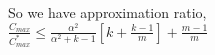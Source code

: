 \documentclass[10pt, conference, compsocconf]{IEEEtran}
\begin{document}
 
 So we have approximation ratio,\\
\hspace*{90pt} $\frac{C_{max}}{C_{max}^{*}} \leq \frac{\alpha^{2}}{\alpha^{2}+k-1}[k+ {\frac{k-1}{m}} ]+ {\frac{m-1}{m}}  $ \\    







%
%



%
%
\end{document}
